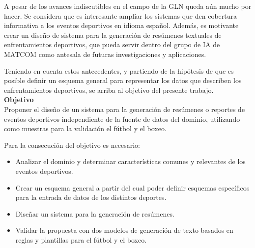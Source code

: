 A pesar de los avances indiscutibles en el campo de la GLN queda aún mucho por hacer. Se considera que es interesante ampliar los sistemas que den cobertura informativa a los eventos 
deportivos en idioma español. Además, es motivante crear un diseño de sistema para la generación de resúmenes textuales de enfrentamientos deportivos, que pueda servir dentro del 
grupo de IA de MATCOM como antesala de futuras investigaciones y aplicaciones.


Teniendo en cuenta estos antecedentes, y partiendo de la hipótesis de que es posible definir un esquema general para representar los datos que describen los enfrentamientos deportivos,
se arriba al objetivo del presente trabajo.\\



    \textbf{Objetivo}\\

    Proponer el diseño de un sistema para la generación de res\'umenes o reportes de eventos deportivos 
independiente de la fuente de datos del dominio, utilizando como muestras para la validación el fútbol y el boxeo.


    Para la consecución del objetivo es necesario:

    \begin{itemize}
        \item Analizar el dominio y determinar características comunes y relevantes de los eventos deportivos.
        \item Crear un esquema general a partir del cual poder definir esquemas específicos para la entrada de datos de los distintos deportes.
        \item Diseñar un sistema para la generación de resúmenes.
        \item Validar la propuesta con dos modelos de generación de texto basados en reglas y plantillas para el fútbol y el boxeo.   
    \end{itemize}


